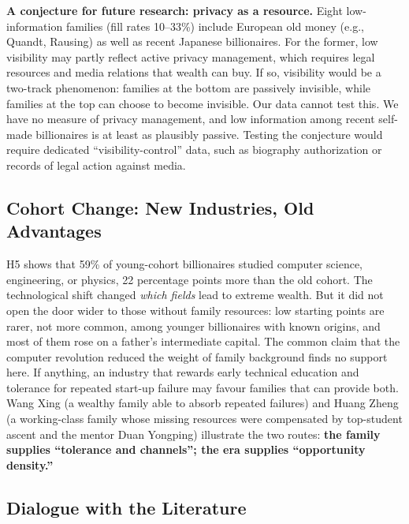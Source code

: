 \documentclass[11pt,a4paper]{article}
\begin{document}
\textbf{A conjecture for future research: privacy as a resource.} Eight low-information families (fill rates 10--33\%) include European old money (e.g., Quandt, Rausing) as well as recent Japanese billionaires. For the former, low visibility may partly reflect active privacy management, which requires legal resources and media relations that wealth can buy. If so, visibility would be a two-track phenomenon: families at the bottom are passively invisible, while families at the top can choose to become invisible. Our data cannot test this. We have no measure of privacy management, and low information among recent self-made billionaires is at least as plausibly passive. Testing the conjecture would require dedicated ``visibility-control'' data, such as biography authorization or records of legal action against media.

\subsection{Cohort Change: New Industries, Old Advantages}

H5 shows that 59\% of young-cohort billionaires studied computer science, engineering, or physics, 22 percentage points more than the old cohort. The technological shift changed \emph{which fields} lead to extreme wealth. But it did not open the door wider to those without family resources: low starting points are rarer, not more common, among younger billionaires with known origins, and most of them rose on a father's intermediate capital. The common claim that the computer revolution reduced the weight of family background finds no support here. If anything, an industry that rewards early technical education and tolerance for repeated start-up failure may favour families that can provide both. Wang Xing (a wealthy family able to absorb repeated failures) and Huang Zheng (a working-class family whose missing resources were compensated by top-student ascent and the mentor Duan Yongping) illustrate the two routes: \textbf{the family supplies ``tolerance and channels''; the era supplies ``opportunity density.''}

\subsection{Dialogue with the Literature}
\end{document}
